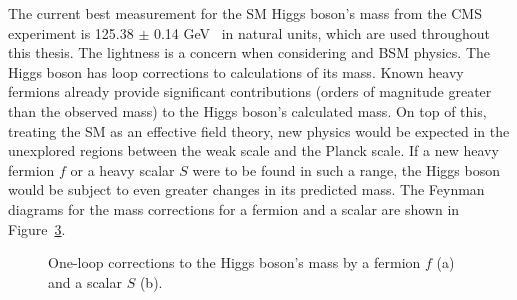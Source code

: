 The current best measurement for the \ac{SM} Higgs boson’s mass from the \ac{CMS} experiment is 125.38 $\pm$ 0.14 GeV~\cite{CMS:2020xrn} in natural units, which are used throughout this thesis.
The lightness is a concern when considering  and \ac{BSM} physics. 
The Higgs boson has loop corrections to calculations of its mass. 
Known heavy fermions already provide significant contributions (orders of magnitude greater than the observed mass) to the Higgs boson’s calculated mass. 
On top of this, treating the \ac{SM} as an effective field theory, new physics would be expected in the unexplored regions between the weak scale and the Planck scale.
If a new heavy fermion $f$ or a heavy scalar $S$ were to be found in such a range, the Higgs boson would be subject to even greater changes in its predicted mass. 
The Feynman diagrams for the mass corrections for a fermion and a scalar are shown in Figure~\ref{fig:Higgs_One_Loop_Corrections}.

\begin{figure}[H]
\centering
    \begin{subfigure}[b]{0.4\textwidth}
    \centering
    \caption{}
    \label{fig:corr_fermion}
    \end{subfigure}
    \begin{subfigure}[b]{0.4\textwidth}
    \centering
    \caption{}
    \label{fig:corr_scalar}
    \end{subfigure}
    \caption[Feynman diagrams for the corrections to the Higgs boson's mass.]{One-loop corrections to the Higgs boson's mass by a fermion $f$ (a) and a scalar $S$ (b).}
    \label{fig:Higgs_One_Loop_Corrections}
\end{figure}

